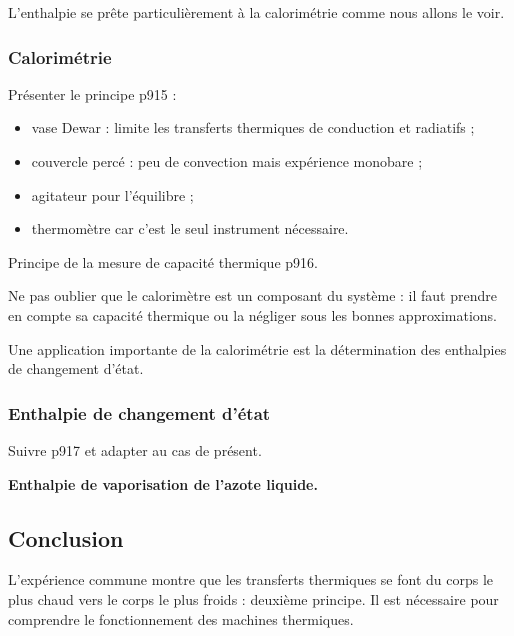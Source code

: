 \begin{transition}
L'enthalpie se prête particulièrement à la calorimétrie comme nous allons le voir.
\end{transition}

\subsubsection{Calorimétrie}

Présenter le principe \cite{Salamito2016} p915 :
\begin{itemize}
\item vase Dewar : limite les transferts thermiques de conduction et radiatifs ;
\item couvercle percé : peu de convection mais expérience monobare ;
\item agitateur pour l'équilibre ;
\item thermomètre car c'est le seul instrument nécessaire.
\end{itemize}
Principe de la mesure de capacité thermique \cite{Salamito2016} p916.

\begin{remarque}
Ne pas oublier que le calorimètre est un composant du système : il faut prendre en compte sa capacité thermique ou la négliger sous les bonnes approximations.
\end{remarque}

\begin{transition}
Une application importante de la calorimétrie est la détermination des enthalpies de changement d'état.
\end{transition}

\subsubsection{Enthalpie de changement d'état}

Suivre \cite{Salamito2016} p917 et adapter au cas de présent.

\begin{experience}
\textbf{Enthalpie de vaporisation de l'azote liquide.}
\end{experience}

\subsection*{Conclusion}

L'expérience commune montre que les transferts thermiques se font du corps le plus chaud vers le corps le plus froids : deuxième principe.
Il est nécessaire pour comprendre le fonctionnement des machines thermiques.

